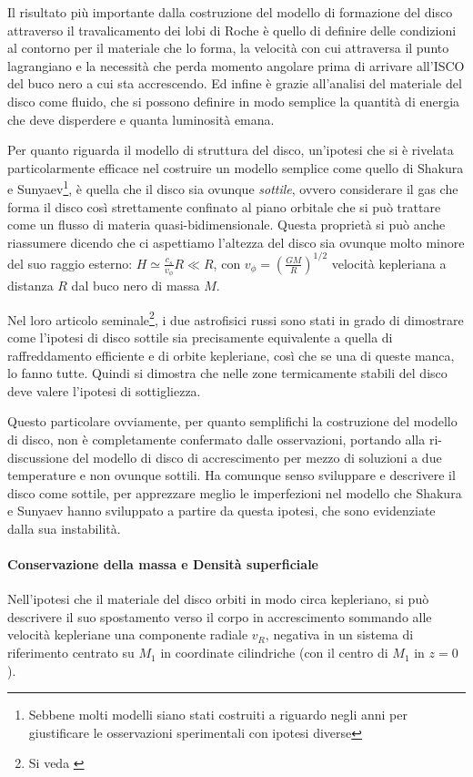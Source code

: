 \documentclass[a4paperbi]{article}
\begin{document}
	Il risultato più importante dalla costruzione del modello di formazione del disco attraverso il travalicamento dei lobi di Roche è quello di definire delle condizioni al contorno per il materiale che lo forma, la velocità con cui attraversa il punto lagrangiano e la necessità che perda momento angolare prima di arrivare all'ISCO del buco nero a cui sta accrescendo. Ed infine è grazie all'analisi del materiale del disco come fluido, che si possono definire in modo semplice la quantità di energia che deve disperdere e quanta luminosità emana.

	Per quanto riguarda il modello di struttura del disco, un'ipotesi che si è rivelata particolarmente efficace nel costruire un modello semplice come quello di Shakura e Sunyaev\footnote{Sebbene molti modelli siano stati costruiti a riguardo negli anni per giustificare le osservazioni sperimentali con ipotesi diverse}, è quella che il disco sia ovunque \textit{sottile}, ovvero considerare il gas che forma il disco così strettamente confinato al piano orbitale che si può trattare come un flusso di materia quasi-bidimensionale. Questa proprietà si può anche riassumere dicendo che ci aspettiamo l'altezza del disco sia ovunque molto minore del suo raggio esterno: $H\simeq\frac{c_s}{v_\phi}R\ll R$, con $v_\phi=\left(\frac{GM}{R}\right)^{1/2}$ velocità kepleriana a distanza $R$ dal buco nero di massa $M$.
	
	Nel loro articolo seminale\footnote{Si veda \cite{ShakuraSunyaev1973}}, i due astrofisici russi sono stati in grado di dimostrare come l'ipotesi di disco sottile sia precisamente equivalente a quella di raffreddamento efficiente e di orbite kepleriane, così che se una di queste manca, lo fanno tutte. Quindi si dimostra che nelle zone termicamente stabili del disco deve valere l'ipotesi di sottigliezza.
	
	Questo particolare ovviamente, per quanto semplifichi la costruzione del modello di disco, non è completamente confermato dalle osservazioni, portando alla ri-discussione del modello di disco di accrescimento per mezzo di soluzioni a due temperature e non ovunque sottili. Ha comunque senso sviluppare e descrivere il disco come sottile, per apprezzare meglio le imperfezioni nel modello che Shakura e Sunyaev hanno sviluppato a partire da questa ipotesi, che sono evidenziate dalla sua instabilità.
		
	\paragraph{Conservazione della massa e Densità superficiale}
		Nell'ipotesi che il materiale del disco orbiti in modo circa kepleriano, si può descrivere il suo spostamento verso il corpo in accrescimento sommando alle velocità kepleriane una componente radiale $v_R$, negativa in un sistema di riferimento centrato su $M_1$ in coordinate cilindriche (con il centro di $M_1$ in $z=0$).
\end{document}
